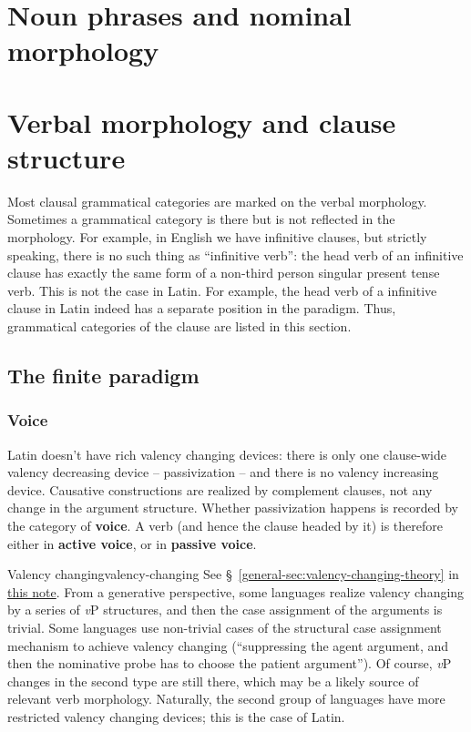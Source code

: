 \documentclass[UTF8, a4paper, oneside, scheme=plain]{ctexrep}
\newcommand*{\citesec}[1]{\S~{#1}}
\newcommand*{\concept}[1]{\textbf{#1}}
\newcommand{\general}{\href{../methodology/glossing.pdf}{this note}}
\newcommand{\vP}{\textit{v}P}
\begin{document}
\section{Noun phrases and nominal morphology}

\section{Verbal morphology and clause structure}

Most clausal grammatical categories are marked on the verbal morphology.
Sometimes a grammatical category is there but is not reflected in the morphology.
For example, in English we have infinitive clauses,
but strictly speaking, there is no such thing as ``infinitive verb'':
the head verb of an infinitive clause 
has exactly the same form of a non-third person singular present tense verb.
This is not the case in Latin.
For example, the head verb of a infinitive clause in Latin 
indeed has a separate position in the paradigm.
Thus, grammatical categories of the clause are listed in this section.

\subsection{The finite paradigm}

\subsubsection{Voice}

Latin doesn't have rich valency changing devices:
there is only one clause-wide valency decreasing device -- passivization -- 
and there is no valency increasing device.
Causative constructions are realized by complement clauses,
not any change in the argument structure.
Whether passivization happens is recorded by the category of \concept{voice}.
A verb (and hence the clause headed by it) is therefore either in \concept{active voice},
or in \concept{passive voice}.

\begin{theorybox}{Valency changing}{valency-changing}
    See \citesec{\ref{general-sec:valency-changing-theory}} in \general.
    From a generative perspective, some languages realize valency changing 
    by a series of \vP{} structures, and then the case assignment of the arguments is trivial.
    Some languages use non-trivial cases of 
    the structural case assignment mechanism 
    to achieve valency changing 
    (``suppressing the agent argument, and then the nominative probe has to choose the patient argument'').
    Of course, \vP{} changes in the second type are still there,
    which may be a likely source of relevant verb morphology.
    Naturally, the second group of languages have more restricted valency changing devices;
    this is the case of Latin.
\end{theorybox}
\end{document}
